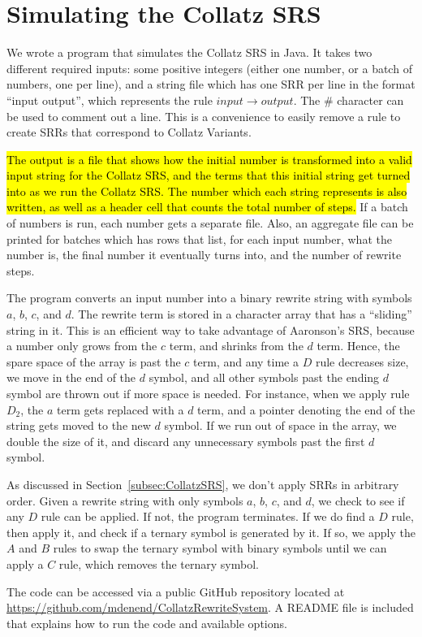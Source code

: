 \section{Simulating the Collatz SRS} \label{subsec:rewritecomp}
We wrote a program that simulates the Collatz SRS in Java. It takes two different required inputs: some positive integers (either one number, or a batch of numbers, one per line), and a string file which has one SRR per line in the format ``input output'', which represents the rule $input \rightarrow output$. The \# character can be used to comment out a line. This is a convenience to easily remove a rule to create SRRs that correspond to Collatz Variants. \par
\hl{The output is a file that shows how the initial number is transformed into a valid input string for the Collatz SRS, and the terms that this initial string get turned into as we run the Collatz SRS. The number which each string represents is also written, as well as a header cell that counts the total number of steps.} If a batch of numbers is run, each number gets a separate file. Also, an aggregate file can be printed for batches which has rows that list, for each input number, what the number is, the final number it eventually turns into, and the number of rewrite steps. \par
The program converts an input number into a binary rewrite string with symbols $a$, $b$, $c$, and $d$. The rewrite term is stored in a character array that has a ``sliding'' string in it. This is an efficient way to take advantage of Aaronson's SRS, because a number only grows from the $c$ term, and shrinks from the $d$ term. Hence, the spare space of the array is past the $c$ term, and any time a $D$ rule decreases size, we move in the end of the $d$ symbol, and all other symbols past the ending $d$ symbol are thrown out if more space is needed. For instance, when we apply rule $D_2$, the $a$ term gets replaced with a $d$ term, and a pointer denoting the end of the string gets moved to the new $d$ symbol. If we run out of space in the array, we double the size of it, and discard any unnecessary symbols past the first $d$ symbol. \par
As discussed in Section~\ref{subsec:CollatzSRS}, we don't apply SRRs in arbitrary order. Given a rewrite string with only symbols $a$, $b$, $c$, and $d$, we check to see if any $D$ rule can be applied. If not, the program terminates. If we do find a $D$ rule, then apply it, and check if a ternary symbol is generated by it. If so, we apply the $A$ and $B$ rules to swap the ternary symbol with binary symbols until we can apply a $C$ rule, which removes the ternary symbol. \par
The code can be accessed via a public GitHub repository located at \url{https://github.com/mdenend/CollatzRewriteSystem}. A README file is included that explains how to run the code and available options.


